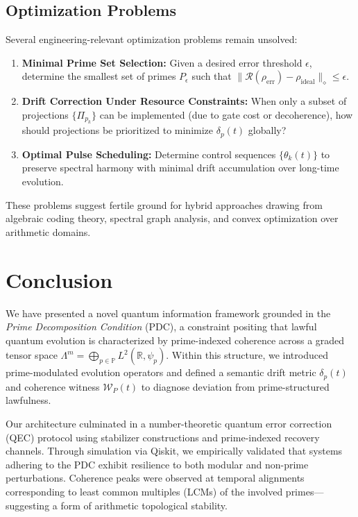 \documentclass[12]{amsart}
\theoremstyle{plain}
\begin{document}
\subsection{Optimization Problems}

Several engineering-relevant optimization problems remain unsolved:

\begin{enumerate}
    \item \textbf{Minimal Prime Set Selection:}  
    Given a desired error threshold $\epsilon$, determine the smallest set of primes $P_\epsilon$ such that $\| \mathcal{R}(\rho_{\text{err}}) - \rho_{\text{ideal}} \|_\diamond \leq \epsilon$.

    \item \textbf{Drift Correction Under Resource Constraints:}  
    When only a subset of projections $\{ \Pi_{p_k} \}$ can be implemented (due to gate cost or decoherence), how should projections be prioritized to minimize $\delta_p(t)$ globally?

    \item \textbf{Optimal Pulse Scheduling:}  
    Determine control sequences $\{ \theta_k(t) \}$ to preserve spectral harmony with minimal drift accumulation over long-time evolution.
\end{enumerate}

These problems suggest fertile ground for hybrid approaches drawing from algebraic coding theory, spectral graph analysis, and convex optimization over arithmetic domains.

\section{Conclusion}

We have presented a novel quantum information framework grounded in the \textit{Prime Decomposition Condition} (PDC), a constraint positing that lawful quantum evolution is characterized by prime-indexed coherence across a graded tensor space $\Lambda^m = \bigoplus_{p \in \mathbb{P}} L^2(\mathbb{R}, \psi_p)$. Within this structure, we introduced prime-modulated evolution operators and defined a semantic drift metric $\delta_p(t)$ and coherence witness $\mathcal{W}_P(t)$ to diagnose deviation from prime-structured lawfulness.

Our architecture culminated in a number-theoretic quantum error correction (QEC) protocol using stabilizer constructions and prime-indexed recovery channels. Through simulation via Qiskit, we empirically validated that systems adhering to the PDC exhibit resilience to both modular and non-prime perturbations. Coherence peaks were observed at temporal alignments corresponding to least common multiples (LCMs) of the involved primes—suggesting a form of arithmetic topological stability.
\end{document}

